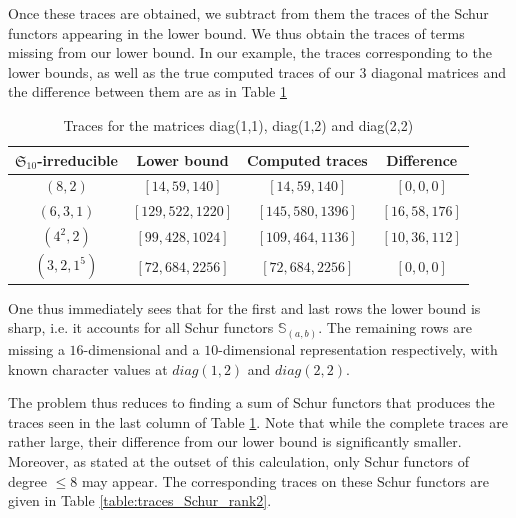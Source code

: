 \documentclass[12pt]{article}
\newcommand{\SymGroup}[1][n]{\mathfrak{S}_{#1}}
\newcommand{\Schur}[1]{\mathbb{S}_{#1}}
\theoremstyle{plain}
\theoremstyle{definition}
\theoremstyle{remark}
\begin{document}
Once these traces are obtained, we subtract from them the traces of the Schur functors appearing in the lower bound. We thus obtain the traces of terms missing from our lower bound. In our example, the traces corresponding to the lower bounds, as well as the true computed traces of our $3$ diagonal matrices and the difference between them are as in Table \ref{table:traces_rank2}
\begin{table}[h]
    \centering
    \begin{tabular}{|c||c|c|c|}
\hline
$\SymGroup[10]$-irreducible & Lower bound & Computed traces & Difference \\
\hline
$(8,2)$ & $[14, 59, 140]$ & $[14, 59, 140]$ & $[0, 0, 0]$ \\ 
\hline
$(6,3,1)$ & $[129, 522, 1220]$ & $[145, 580, 1396]$ & $[16, 58, 176]$ \\ 
\hline
$(4^2,2)$ & $[99, 428, 1024]$ & $[109, 464, 1136]$ & $[10, 36, 112]$ \\ 
\hline
$(3,2,1^5)$ & $[72, 684, 2256]$ & $[72, 684, 2256]$ & $[0, 0, 0]$ \\ 
\hline
    \end{tabular}
    \caption{Traces for the matrices diag(1,1), diag(1,2) and diag(2,2)}
    \label{table:traces_rank2}
\end{table}


One thus immediately sees that for the first and last rows the lower bound is sharp, i.e. it accounts for all Schur functors $\Schur{(a,b)}$. The remaining rows are missing a $16$-dimensional and a $10$-dimensional representation respectively, with known character values at $diag(1,2)$ and $diag(2,2)$.


The problem thus reduces to finding a sum of Schur functors that produces the traces seen in the last column of Table \ref{table:traces_rank2}. Note that while the complete traces are rather large, their difference from our lower bound is significantly smaller. Moreover, as stated at the outset of this calculation, only Schur functors of degree $\leq 8$ may appear. The corresponding traces on these Schur functors are given in Table \ref{table:traces_Schur_rank2}.
\end{document}
